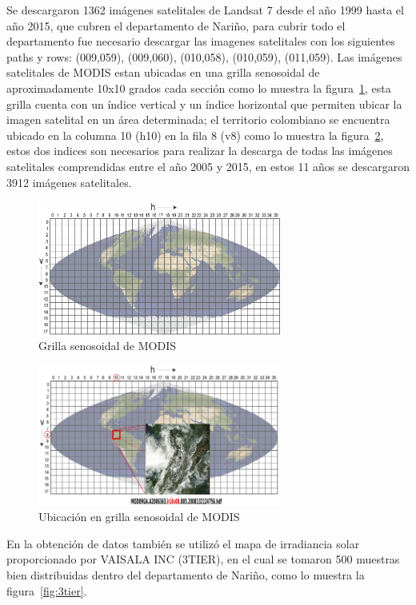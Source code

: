 Se descargaron 1362 imágenes satelitales de Landsat 7 desde
 el año 1999 hasta el año 2015, que cubren el 
departamento de Nariño, para cubrir todo el departamento fue necesario descargar las imagenes satelitales con 
los siguientes paths y rows: (009,059), (009,060), (010,058), (010,059), (011,059). 
Las imágenes satelitales de MODIS estan ubicadas en una grilla senosoidal de aproximadamente 10x10 grados 
cada sección  como lo muestra la figura~\ref{fig:gridmodis}, esta grilla cuenta 
con un índice vertical y un índice horizontal que permiten ubicar la imagen satelital en
un área determinada; el territorio colombiano se encuentra 
ubicado en la columna 10 (h10) en la fila 8 (v8) como lo muestra la figura~\ref{fig:colombiagridmodis}, estos dos indices son necesarios 
para realizar la descarga de todas las imágenes satelitales comprendidas entre el año 2005 y 2015, en estos 11 años se 
descargaron 3912 imágenes satelitales.

\begin{figure}
  \centering 
  \includegraphics[width = 8cm]{MODIS_sinusoidal_grid.png}
  \caption{Grilla senosoidal de MODIS} 
  \label{fig:gridmodis}
\end{figure}

\begin{figure}
  \centering 
  \includegraphics[width = 8cm]{mipc.png}
  \caption{Ubicación en grilla senosoidal de MODIS} 
  \label{fig:colombiagridmodis}
\end{figure}

En la obtención de datos también se utilizó el mapa de irradiancia solar proporcionado por VAISALA INC (3TIER), en el cual
se tomaron 500 muestras bien distribuidas dentro del departamento de Nariño, como lo muestra la figura~\ref{fig:3tier}.

